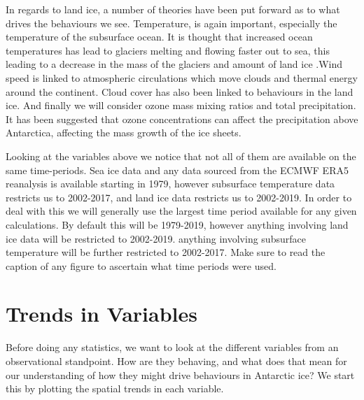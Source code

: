 \documentclass[../main.tex]{subfiles}
\begin{document}
In regards to land ice, a number of theories have been put forward as to what drives the behaviours we see. Temperature, is again important, especially the temperature of the subsurface ocean. It is thought that increased ocean temperatures has lead to glaciers melting and flowing faster out to sea, this leading to a decrease in the mass of the glaciers and amount of land ice .Wind speed is linked to atmospheric circulations which move clouds and thermal energy around the continent. Cloud cover has also been linked to behaviours in the land ice. And finally we will consider ozone mass mixing ratios and total precipitation. It has been suggested that ozone concentrations can affect the precipitation above Antarctica, affecting the mass growth of the ice sheets.


Looking at the variables above we notice that not all of them are available on the same time-periods. Sea ice data and any data sourced from the ECMWF ERA5 reanalysis is available starting in 1979, however subsurface temperature data restricts us to 2002-2017, and land ice data restricts us to 2002-2019. In order to deal with this we will generally use the largest time period available for any given calculations. By default this will be 1979-2019, however anything involving land ice data will be restricted to 2002-2019. anything involving subsurface temperature will be further restricted to 2002-2017. Make sure to read the caption of any figure to ascertain what time periods were used.

\section{Trends in Variables}
Before doing any statistics, we want to look at the different variables from an observational standpoint. How are they behaving, and what does that mean for our understanding of how they might drive behaviours in Antarctic ice? We start this by plotting the spatial trends in each variable.

\end{document}

